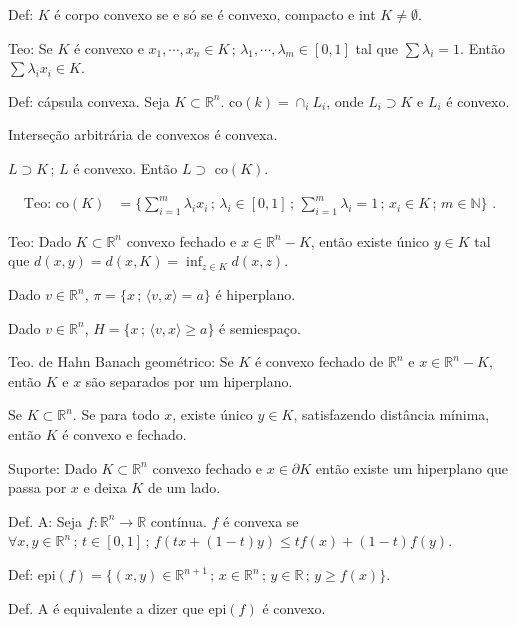 \documentclass[12pt]{article}
\begin{document}
\begin{flushright}
\end{flushright}

Def: $K$ \'e corpo convexo se e s\'o se \'e convexo, compacto e int $K \ne \emptyset$.

Teo: Se $K$ \'e convexo e $x_1,\cdots,x_n\in K\,;\,\lambda_1,\cdots,\lambda_m \in [0,1]$ tal que $\sum \lambda_i = 1$. Ent\~ao $\sum \lambda_i x_i \in K$.

Def: c\'apsula convexa. Seja $K \subset \mathbb{R}^n$. co$(k) = \cap_i L_i$, onde $L_i \supset K$ e $L_i$ \'e convexo.

Interse\c{c}\~ao arbitr\'aria de convexos \'e convexa.

$L \supset K\,;\,L$ \'e convexo. Ent\~ao $L \supset \text{ co}(K)$.

\begin{align}
\text{Teo: co}(K) &= \bigg\{ \sum_{i=1}^m \lambda_i x_i\,;\,\lambda_i \in [0,1]\,;\,\sum_{i=1}^m \lambda_i = 1\,;\,x_i \in K\,;\,m\in \mathbb{N}\bigg\}\,\,.
\end{align}

Teo: Dado $K \subset \mathbb{R}^n$ convexo fechado e $x \in \mathbb{R}^n - K$, ent\~ao existe \'unico $y \in K$ tal que $d(x,y) = d(x, K) = \inf_{z \in K} d(x,z)$.

Dado $v \in \mathbb{R}^n$, $\pi = \{ x \,;\,\langle v, x \rangle = a \}$ \'e hiperplano.

Dado $v \in \mathbb{R}^n$, $H = \{ x \,;\,\langle v, x \rangle \ge a \}$ \'e semiespa\c{c}o.

Teo. de Hahn Banach geom\'etrico: Se $K$ \'e convexo fechado de $\mathbb{R}^n$ e $x \in \mathbb{R}^n - K$, ent\~ao $K$ e $x$ s\~ao separados por um hiperplano.

Se $K \subset \mathbb{R}^n$. Se para todo $x$, existe \'unico $y \in K$, satisfazendo dist\^ancia m\'inima, ent\~ao $K$ \'e convexo e fechado.

Suporte: Dado $K \subset \mathbb{R}^n$ convexo fechado e $x \in \partial K$ ent\~ao existe um hiperplano que passa por $x$ e deixa $K$ de um lado.

Def. A: Seja $f : \mathbb{R}^n \to \mathbb{R}$ cont\'inua. $f$ \'e convexa se $\forall x, y \in \mathbb{R}^n\,;\, t \in [0,1]\,;\,f(tx + (1 - t)y) \le t f(x) + (1 - t) f(y)$.

Def: epi$(f) = \{ (x,y) \in \mathbb{R}^{n+1}\,;\,x\in\mathbb{R}^n\,;\,y\in\mathbb{R}\,;\,y \ge f(x) \}$.

Def. A \'e equivalente a dizer que epi$(f)$ \'e convexo.
\end{document}
